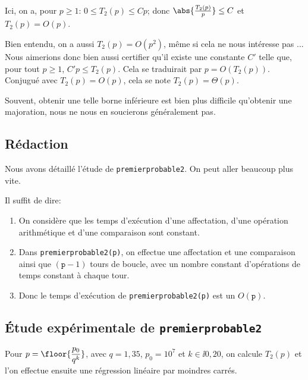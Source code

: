 Ici, on a, pour $p\geq 1$: $0 \leq T_{2}(p) \leq C p$; donc $ \abs{\frac{T_{2}(p)}{p}} \leq C$ et $T_{2}(p)=O(p)$.

\begin{rem}
  Bien entendu, on a aussi $T_2(p) = O(p^2)$, même si cela ne nous intéresse pas ... Nous aimerions donc bien aussi certifier qu'il existe une constante $C'$ telle que, pour tout $p\geq 1$, $C'p \leq T_2(p)$. 
  Cela se traduirait par $p = O(T_2(p))$. Conjugué avec $T_2(p) = O(p)$, cela se note $T_2(p) =\Theta(p)$. 
  
  Souvent, obtenir une telle borne inférieure est bien plus difficile qu'obtenir une majoration, nous ne nous en soucierons généralement pas. 
\end{rem}


\subsection{Rédaction}
Nous avons détaillé l'étude de \texttt{premierprobable2}. On peut aller
beaucoup plus vite.

Il suffit de dire:

\begin{enumerate}
\item On considère que les temps d'exécution d'une affectation, d'une
  opération arithmétique et d'une comparaison sont constant.
\item Dans \texttt{premierprobable2(p)}, on effectue une affectation et
  une comparaison ainsi que $(\texttt{p}-1)$ tours de boucle, avec un
  nombre constant d'opérations de temps constant à chaque tour.
\item Donc le temps d'exécution de \texttt{premierprobable2(p)} est un
  $O(\texttt{p})$.
\end{enumerate}

\subsection{Étude expérimentale de \texttt{premierprobable2}}
Pour $p = \floor{\dfrac{p_0}{q^k}}$, avec $q = 1,35$, $p_0 = 10^7$ et $k\in\ii{0,20}$, on calcule $T_2(p)$ et l'on effectue ensuite une régression linéaire par moindres carrés.


